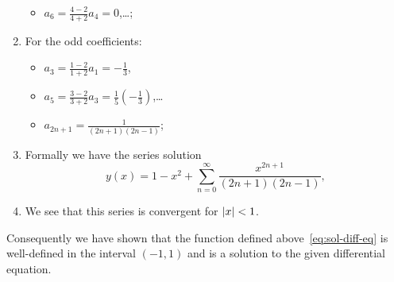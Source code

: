 \begin{solution}
\begin{enumerate}
\begin{itemize}
            \item  \(a_6 =  \frac{4-2}{4+2}a_4 = 0\),\ldots;
          \end{itemize}
    \item For the odd coefficients:
          \begin{itemize}
            \item \(a_3 =  \frac{1-2}{1+2}a_1 = -\frac{1}{3}\),
            \item \(a_5= \frac{3-2}{3+2}a_3 = \frac{1}{5}(-\frac{1}{3})\),\ldots
            \item \(a_{2n+1} = \frac{1}{(2n+1)(2n-1)}\);
          \end{itemize}
    \item Formally we have the series solution
          \begin{equation}
            \label{eq:sol-diff-eq}
            y(x) = 1 - x^2 + \sum_{n=0}^{\infty} \frac{x^{2n+1}}{(2n+1)(2n-1)},
          \end{equation}
    \item We see that this series is convergent for \(\left|x\right|<1\).
  \end{enumerate}
  Consequently we have shown that the function defined above~\eqref{eq:sol-diff-eq} is well-defined in the interval \((-1,1)\) and is a solution to the given differential equation.
\end{solution}









